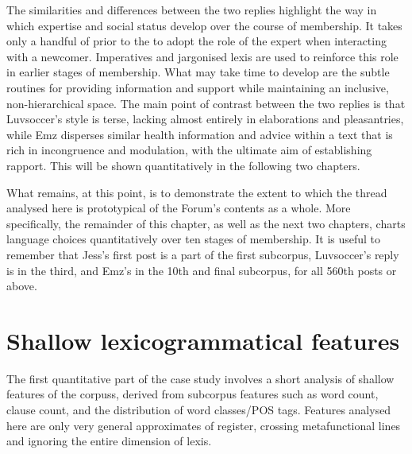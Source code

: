 

The similarities and differences between the two replies highlight the way in which expertise and social status develop over the course of membership. It takes only a handful of prior  to the  to adopt the role of the expert when interacting with a newcomer. Imperatives and jargonised lexis are used to reinforce this role in earlier stages of membership. What may take time to develop are the subtle routines for providing information and support while maintaining an inclusive, non\hyp{}hierarchical space. The main point of contrast between the two replies is that Luvsoccer's style is terse, lacking almost entirely in elaborations and pleasantries, while Emz disperses similar health information and advice within a text that is rich in incongruence and modulation, with the ultimate aim of establishing rapport. This will be shown quantitatively in the following two chapters.

What remains, at this point, is to demonstrate the extent to which the \gls{thread} analysed here is prototypical of the \gls{Forum}'s contents as a whole. More specifically, the remainder of this chapter, as well as the next two chapters, charts language choices quantitatively over ten stages of membership. It is useful to remember that Jess's first \gls{post} is a part of the first subcorpus, Luvsoccer's reply is in the third, and Emz's in the 10th and final subcorpus, for all 560th \glspl{post} or above.

\section{Shallow lexicogrammatical features} 

The first quantitative part of the case study involves a short analysis of shallow features of the \glspl{corpus}, derived from subcorpus features such as word count, clause count, and the distribution of word classes\slash \gls{POS} tags. Features analysed here are only very general approximates of register, crossing metafunctional lines and ignoring the entire dimension of lexis.


